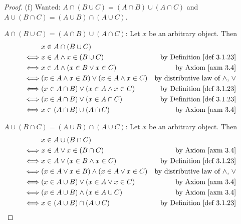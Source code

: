 \begin{proof}{(f)} Wanted: \(A \cap (B \cup C) = (A \cap B) \cup (A \cap C)\) and \(A \cup (B \cap C) = (A \cup B) \cap (A \cup C)\).

\(A \cap (B \cup C) = (A \cap B) \cup (A \cap C)\): Let \(x\) be an arbitrary object. Then
\begin{align*}
         & x \in A \cap (B \cup C) \\
    \iff & x \in A \land x \in (B \cup C) & \text{by \DEF{3.1.23}} \\
    \iff & x \in A \land (x \in B \lor x \in C) & \text{by \AXM{3.4}} \\
    \iff & (x \in A \land x \in B) \lor (x \in A \land x \in C) & \text{by distributive law of \(\land\), \(\lor\)} \\
    \iff & (x \in A \cap B) \lor (x \in A \land x \in C) & \text{by \DEF{3.1.23}} \\
    \iff & (x \in A \cap B) \lor (x \in A \cap C) & \text{by \DEF{3.1.23}} \\
    \iff & x \in (A \cap B) \cup (A \cap C) & \text{by \AXM{3.4}}
\end{align*}

\(A \cup (B \cap C) = (A \cup B) \cap (A \cup C)\): Let \(x\) be an arbitrary object. Then
\begin{align*}
         & x \in A \cup (B \cap C) \\
    \iff & x \in A \lor x \in (B \cap C) & \text{by \AXM{3.4}} \\
    \iff & x \in A \lor (x \in B \land x \in C) & \text{by \DEF{3.1.23}} \\
    \iff & (x \in A \lor x \in B) \land (x \in A \lor x \in C) & \text{by distributive law of \(\land\), \(\lor\)} \\
    \iff & (x \in A \cup B) \lor (x \in A \lor x \in C) & \text{by \AXM{3.4}} \\
    \iff & (x \in A \cup B) \land (x \in A \cup C) & \text{by \AXM{3.4}} \\
    \iff & x \in (A \cup B) \cap (A \cup C) & \text{by \DEF{3.1.23}}
\end{align*}

\end{proof}

